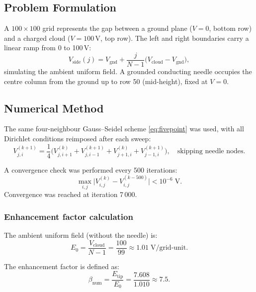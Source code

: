 \documentclass[11pt,a4paper]{article}
\begin{document}
\subsection{Problem Formulation}

A $100 \times 100$ grid represents the gap between a ground plane ($V=0$, bottom row) and a charged cloud ($V=100$\,V, top row). The left and right boundaries carry a linear ramp from 0 to 100\,V:
\begin{equation}
V_{\text{side}}(j) = V_{\text{gnd}} + \frac{j}{N-1}\bigl(V_{\text{cloud}} - V_{\text{gnd}}\bigr),
\end{equation}
simulating the ambient uniform field. A grounded conducting needle occupies the centre column from the ground up to row 50 (mid-height), fixed at $V=0$.

\subsection{Numerical Method}

The same four-neighbour Gauss--Seidel scheme \eqref{eq:fivepoint} was used, with all Dirichlet conditions reimposed after each sweep:
\begin{equation}
V_{j,i}^{(k+1)} = \frac{1}{4}\bigl(V_{j,i+1}^{(k)} + V_{j,i-1}^{(k+1)} + V_{j+1,i}^{(k)} + V_{j-1,i}^{(k+1)}\bigr), \quad \text{skipping needle nodes}.
\end{equation}

A convergence check was performed every 500 iterations:
\begin{equation}
\max_{i,j} \bigl|V_{i,j}^{(k)} - V_{i,j}^{(k-500)}\bigr| < 10^{-6}\;\text{V}.
\end{equation}
Convergence was reached at iteration 7\,000.

\subsubsection{Enhancement factor calculation}

The ambient uniform field (without the needle) is:
\begin{equation}
E_0 = \frac{V_{\text{cloud}}}{N-1} = \frac{100}{99} \approx 1.01\;\text{V/grid-unit}.
\end{equation}

The enhancement factor is defined as:
\begin{equation}
\beta_{\text{num}} = \frac{E_{\text{tip}}}{E_0} = \frac{7.608}{1.010} \approx 7.5.
\end{equation}
\end{document}
